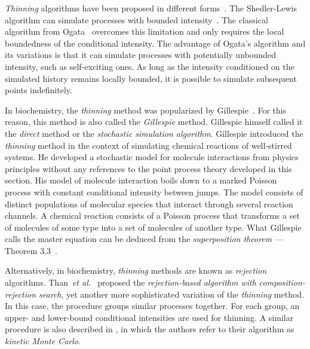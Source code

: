 \documentclass{juliacon}
\newcommand{\etal}{\textit{et al}.}
\begin{document}
\textit{Thinning} algorithms have been proposed in different forms~\cite{daley2003}. The Shedler-Lewis algorithm can simulate processes with bounded intensity~\cite{lewis1976}. The classical algorithm from Ogata~\cite{ogata1981} overcomes this limitation and only requires the local boundedness of the conditional intensity. The advantage of Ogata's algorithm and its variations is that it can simulate processes with potentially unbounded intensity, such as self-exciting ones. As long as the intensity conditioned on the simulated history remains locally bounded, it is possible to simulate subsequent points indefinitely.

In biochemistry, the \textit{thinning} method was popularized by Gillespie~\cite{gillespie1976,gillespie1977}. For this reason, this method is also called the \textit{Gillespie} method. Gillespie himself called it the \textit{direct} method or the \textit{stochastic simulation algorithm}. Gillespie introduced the \textit{thinning} method in the context of simulating chemical reactions of well-stirred systems. He developed a stochastic model for molecule interactions from physics principles without any references to the point process theory developed in this section. His model of molecule interaction boils down to a marked Poisson process with constant conditional intensity between jumps. The model consists of distinct populations of molecular species that interact through several reaction channels. A chemical reaction consists of a Poisson process that transforms a set of molecules of some type into a set of molecules of another type. What Gillespie calls the master equation can be deduced from the \textit{superposition theorem} --- Theorem 3.3~\cite{last2017}.

Alternatively, in biochemistry, \textit{thinning} methods are known as \textit{rejection} algorithms. Than~\etal~\cite{thanh2014,thanh2017} proposed the \textit{rejection-based algorithm with composition-rejection search}, yet another more sophisticated variation of the \textit{thinning} method. In this case, the procedure groups similar processes together. For each group, an upper- and lower-bound conditional intensities are used for thinning. A similar procedure is also described in \cite{slepoy2008}, in which the authors refer to their algorithm as \textit{kinetic Monte Carlo}.
\end{document}
